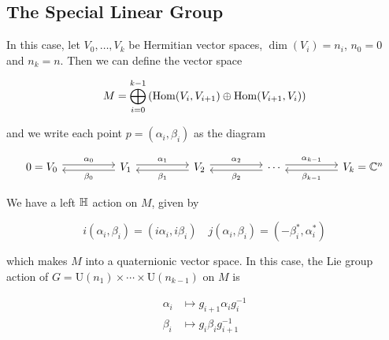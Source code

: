 \documentclass{article}
\newcommand{\rU}{\mathrm{U}}
\begin{document}
\subsection{The Special Linear Group}

In this case, let \(V_0, \dots, V_k\) be Hermitian vector spaces, \(\dim(V_i) = n_i\), \(n_0 = 0\) and \(n_k = n\). Then we can define the vector space

\[M = \bigoplus_{i=0}^{k-1} \left(\operatorname{Hom}(V_i, V_{i+1}) \oplus \operatorname{Hom}(V_{i+1}, V_i)\right)\]

and we write each point \(p = (\alpha_i, \beta_i)\) as the diagram

\[\begin{tikzcd}
	{0=V_0} && {V_1} && {V_2} && \cdots && {V_k=\C^n}
	\arrow["{\alpha_0}", shift left=1, from=1-1, to=1-3]
	\arrow["{\alpha_1}", shift left=1, from=1-3, to=1-5]
	\arrow["{\alpha_2}", shift left=1, from=1-5, to=1-7]
	\arrow["{\alpha_{k-1}}", shift left=1, from=1-7, to=1-9]
	\arrow["{\beta_{k-1}}", shift left=1, from=1-9, to=1-7]
	\arrow["{\beta_2}", shift left=1, from=1-7, to=1-5]
	\arrow["{\beta_1}", shift left=1, from=1-5, to=1-3]
	\arrow["{\beta_0}", shift left=1, from=1-3, to=1-1]
\end{tikzcd}\]

We have a left \(\mathbb{H}\) action on \(M\), given by

\[i(\alpha_i, \beta_i) = (i\alpha_i, i\beta_i) \quad j(\alpha_i, \beta_i) = (-\beta_i^*, \alpha_i^*)\]

which makes \(M\) into a quaternionic vector space. In this case, the Lie group action of \(G = \rU(n_1) \times \cdots \times \rU(n_{k-1})\) on \(M\) is

\begin{equation}
    \label{eq:group-action}
    \begin{split}
        \alpha_i &\mapsto g_{i+1}\alpha_ig_i^{-1} \\
        \beta_i &\mapsto g_i\beta_ig_{i+1}^{-1}
    \end{split}
\end{equation}
\end{document}
